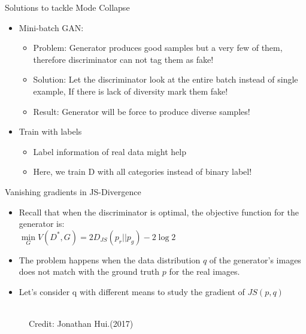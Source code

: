 \begin{frame} {Solutions to tackle Mode Collapse}
\vspace{2mm}
  \begin{itemize}
    \item Mini-batch GAN:
      \begin{itemize}
        \item Problem: Generator produces good samples but a very few of them, therefore discriminator can not tag them as fake!
        \item Solution: Let the discriminator look at the entire batch instead of single example, If there is lack of diversity mark them fake! 
        \item Result: Generator will be force to produce diverse samples!
      \end{itemize}
    \item Train with labels
          \begin{itemize}
            \item Label information of real data might help
            \item Here, we train D with all categories instead of binary label!
          \end{itemize}
  \end{itemize}
\end{frame}

\begin{frame} {Vanishing gradients in JS-Divergence}
\vspace{2mm}
  \begin{itemize}
    \item Recall that when the discriminator is optimal, the objective function for the generator is:\\
     $\min \limits_G V(D^*,G) = 2 D_{JS} (p_r || p_g) - 2 \log 2 $
    \vspace{2mm}
    \item  The problem happens when the data distribution $q$ of the generator's images does not match with the ground truth $p$ for the real images.
    \item  Let's consider q with different means to study the gradient of $JS(p, q)$
  \end{itemize}
  
    \begin{figure}
    \centering
      \tiny{\\Credit: Jonathan Hui.(2017)}
  \end{figure}

\end{frame}

